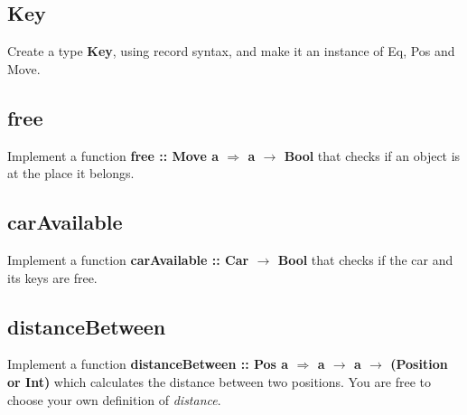 \documentclass{article}
\begin{document}
\subsection{Key}
Create a type \textbf{Key}, using record syntax, and make it an instance of Eq, Pos and Move.

\subsection{free}
Implement a function \textbf{free :: Move a $\Rightarrow$ a $\rightarrow$ Bool} that checks if an object is at the place it belongs.

\subsection{carAvailable}
Implement a function \textbf{carAvailable :: Car $\rightarrow$ Bool} that checks if the car and its keys are free.

\subsection{distanceBetween}
Implement a function \textbf{distanceBetween :: Pos a $\Rightarrow$ a $\rightarrow$ a $\rightarrow$ (Position or Int)} which calculates the distance between two positions. You are free to choose your own definition of \textit{distance}.
\end{document}

